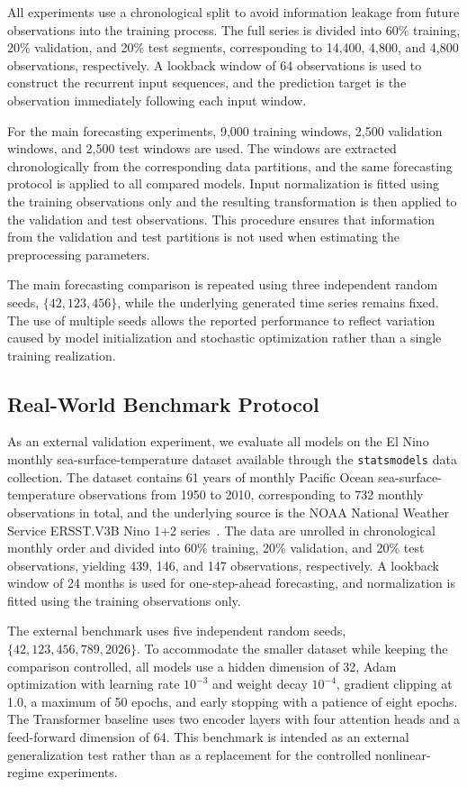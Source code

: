 \documentclass[journal]{IEEEtran}
\begin{document}
All experiments use a chronological split to avoid information leakage from future observations into the training process. The full series is divided into 60\% training, 20\% validation, and 20\% test segments, corresponding to 14,400, 4,800, and 4,800 observations, respectively. A lookback window of 64 observations is used to construct the recurrent input sequences, and the prediction target is the observation immediately following each input window.

For the main forecasting experiments, 9,000 training windows, 2,500 validation windows, and 2,500 test windows are used. The windows are extracted chronologically from the corresponding data partitions, and the same forecasting protocol is applied to all compared models. Input normalization is fitted using the training observations only and the resulting transformation is then applied to the validation and test observations. This procedure ensures that information from the validation and test partitions is not used when estimating the preprocessing parameters.

The main forecasting comparison is repeated using three independent random seeds, $\{42,123,456\}$, while the underlying generated time series remains fixed. The use of multiple seeds allows the reported performance to reflect variation caused by model initialization and stochastic optimization rather than a single training realization.

\subsection{Real-World Benchmark Protocol}
\label{subsec:realworld_protocol}

As an external validation experiment, we evaluate all models on the El Nino monthly sea-surface-temperature dataset available through the \texttt{statsmodels} data collection. The dataset contains 61 years of monthly Pacific Ocean sea-surface-temperature observations from 1950 to 2010, corresponding to 732 monthly observations in total, and the underlying source is the NOAA National Weather Service ERSST.V3B Nino 1+2 series~\cite{seabold2010statsmodels}. The data are unrolled in chronological monthly order and divided into 60\% training, 20\% validation, and 20\% test observations, yielding 439, 146, and 147 observations, respectively. A lookback window of 24 months is used for one-step-ahead forecasting, and normalization is fitted using the training observations only.

The external benchmark uses five independent random seeds, $\{42,123,456,789,2026\}$. To accommodate the smaller dataset while keeping the comparison controlled, all models use a hidden dimension of 32, Adam optimization with learning rate $10^{-3}$ and weight decay $10^{-4}$, gradient clipping at 1.0, a maximum of 50 epochs, and early stopping with a patience of eight epochs. The Transformer baseline uses two encoder layers with four attention heads and a feed-forward dimension of 64. This benchmark is intended as an external generalization test rather than as a replacement for the controlled nonlinear-regime experiments.
\end{document}
